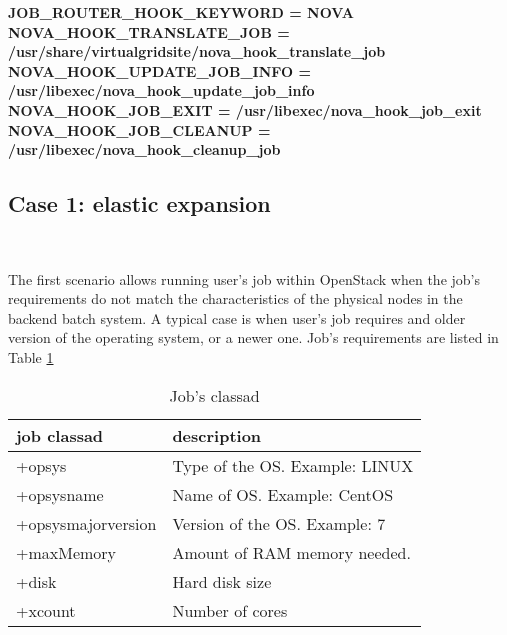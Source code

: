 \documentclass[a4paper]{jpconf}
\begin{document}
\begin{center}
    \colorbox{htcondorbox}{
        \begin{minipage}{\textwidth}
        \small
            \bf{JOB\_ROUTER\_HOOK\_KEYWORD = NOVA \newline \newline
                NOVA\_HOOK\_TRANSLATE\_JOB = /usr/share/virtualgridsite/nova\_hook\_translate\_job \newline
                NOVA\_HOOK\_UPDATE\_JOB\_INFO = /usr/libexec/nova\_hook\_update\_job\_info \newline
                NOVA\_HOOK\_JOB\_EXIT = /usr/libexec/nova\_hook\_job\_exit \newline
                NOVA\_HOOK\_JOB\_CLEANUP = /usr/libexec/nova\_hook\_cleanup\_job
            }
        \end{minipage}
    }
\end{center}



\subsection{Case 1: elastic expansion}

~

The first scenario allows running user's job within OpenStack when
the job's requirements do not match the characteristics of the physical nodes in
the backend batch system.
A typical case is when user's job requires and older version of the operating
system, or a newer one.
Job's requirements are listed in Table \ref{table:classad1}


\begin{table}[h]
\centering
\begin{tabular}{ l l }
  \hline
  \textbf{job classad} & \textbf{description} \\
  \hline
  +opsys & Type of the OS. Example: LINUX  \\
  +opsysname & Name of OS. Example: CentOS \\
  +opsysmajorversion & Version of the OS. Example: 7 \\
  +maxMemory & Amount of RAM memory needed. \\
  +disk & Hard disk size \\
  +xcount & Number of cores \\
  \hline
\end{tabular}
\caption{Job's classad}
\label{table:classad1}
\end{table}
\end{document}
